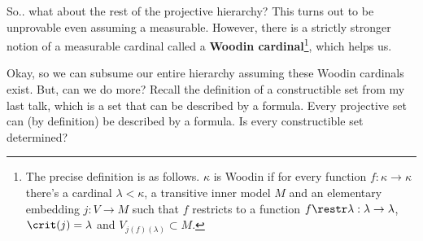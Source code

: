 
So.. what about the rest of the projective hierarchy? This turns out to be unprovable even assuming a measurable. However, there is a strictly stronger notion of a measurable cardinal called a \textbf{Woodin cardinal}\footnote{The precise definition is as follows. $\kappa$ is Woodin if for every function $f:\kappa\to\kappa$ there's a cardinal $\lambda<\kappa$, a transitive inner model $M$ and an elementary embedding $j:V\to M$ such that $f$ restricts to a function $f\restr\lambda:\lambda\to\lambda$, $\crit(j)=\lambda$ and $V_{j(f)(\lambda)}\subset M$.}, which helps us.


Okay, so we can subsume our entire hierarchy assuming these Woodin cardinals exist. But, can we do more? Recall the definition of a constructible set from my last talk, which is a set that can be described by a formula. Every projective set can (by definition) be described by a formula. Is every constructible set determined?



